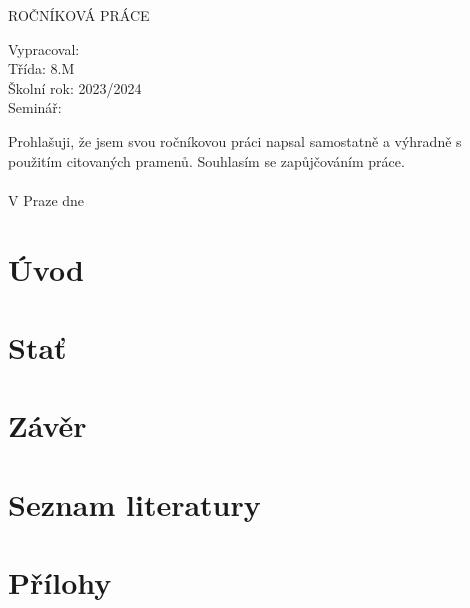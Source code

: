 \documentclass[12pt]{article}
\begin{document}
\begin{titlepage}
   \begin{center}
      \Large
      \textbf{\school}
      \vspace{4cm}

      \Large
      ROČNÍKOVÁ PRÁCE 
      \vspace{0.5cm}

      \huge
      \textbf{\project}
   \end{center}

   \vfill

   \Large \noindent
   Vypracoval: \name\\
   Třída: 8.M\\
   Školní rok: 2023/2024\\
   Seminář: \seminar
\end{titlepage}

\vspace{9cm}

\noindent
Prohlašuji, že jsem svou ročníkovou práci napsal samostatně a výhradně s použitím
citovaných pramenů. Souhlasím se zapůjčováním práce.\\\\
V Praze dne \date \hfill \name

\thispagestyle{empty}
\newpage

\tableofcontents
\newpage
\linespread{1.5}

\section{Úvod}

\section{Stať}

\section{Závěr}

\section*{Seznam literatury}

\section*{Přílohy}
\end{document}
